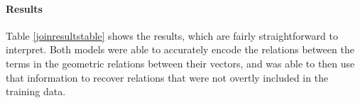 
\paragraph{Results} 
Table \ref{joinresultstable} shows the results, which are fairly straightforward 
to interpret. Both models were able to accurately encode the relations 
between the terms in the geometric relations between their vectors, 
and was able to then use that information to recover relations that 
were not overtly included in the training data.  

